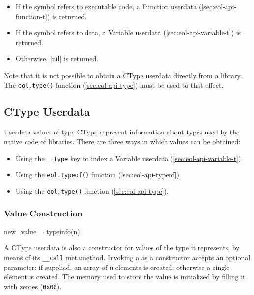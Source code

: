 \begin{itemize}

	\item If the symbol refers to executable code, a \textsf{Function} userdata
	(\autoref{sec:eol-api-function-t}) is returned.

	\item If the symbol refers to data, a \textsf{Variable} userdata
	(\autoref{sec:eol-api-variable-t}) is returned.

	\item Otherwise, \Mlua|nil| is returned.

\end{itemize}

Note that it is not possible to obtain a \textsf{CType} userdata directly from
a library. The \texttt{eol.type()} function (\autoref{sec:eol-api-type}) must
be used to that effect.


\subsection{CType Userdata}
	\label{sec:eol-api-ctype-t}

Userdata values of type \textsf{CType} represent information about types used
by the native code of libraries. There are three ways in which values can be
obtained:

\begin{itemize}

	\item Using the \texttt{\_\_type} key to index a \textsf{Variable}
	userdata (\autoref{sec:eol-api-variable-t}).

	\item Using the \texttt{eol.typeof()} function
	(\autoref{sec:eol-api-typeof}).

	\item Using the \texttt{eol.type()} function (\autoref{sec:eol-api-type}).

\end{itemize}


\subsubsection{Value Construction}

\begin{luacode}
new_value = typeinfo(n)
\end{luacode}

A \textsf{CType} userdata is also a \gls{constructor} for values of the type
it represents, by means of its \texttt{\_\_call} metamethod. Invoking
a \value{CType} as a constructor accepts an optional parameter: if supplied,
an array of \texttt{n} elements is created; otherwise a single element is
created. The memory used to store the value is initialized by filling it with
zeroes (\texttt{0x00}).

